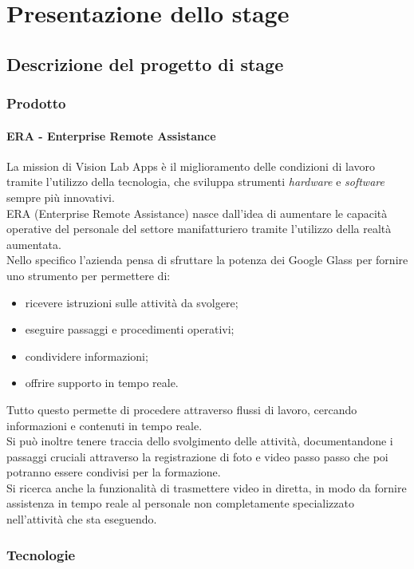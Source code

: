 
\chapter{Presentazione dello stage}
  \section{Descrizione del progetto di stage}
    \subsection{Prodotto}
    \subsubsection*{ERA - Enterprise Remote Assistance}
      La mission di Vision Lab Apps è il miglioramento delle condizioni di lavoro tramite l'utilizzo della tecnologia, che sviluppa strumenti \textit{hardware} e \textit{software} sempre più innovativi.\\
      ERA (Enterprise Remote Assistance) nasce dall'idea di aumentare le capacità operative del personale del settore manifatturiero tramite l'utilizzo della realtà aumentata.\\
      Nello specifico l'azienda pensa di sfruttare la potenza dei Google Glass per fornire uno strumento per permettere di:
      \begin{itemize}
        \item ricevere istruzioni sulle attività da svolgere;
        \item eseguire passaggi e procedimenti operativi;
        \item condividere informazioni;
        \item offrire supporto in tempo reale.
      \end{itemize}
      Tutto questo permette di procedere attraverso flussi di lavoro, cercando informazioni e contenuti in tempo reale.\\
      Si può inoltre tenere traccia dello svolgimento delle attività, documentandone i passaggi cruciali attraverso la registrazione di foto e video passo passo che poi potranno essere condivisi per la formazione.\\
      Si ricerca anche la funzionalità di trasmettere video in diretta, in modo da fornire assistenza in tempo reale al personale non completamente specializzato nell'attività che sta eseguendo.
    \newpage
    \subsection{Tecnologie}
